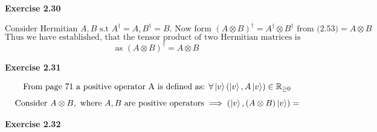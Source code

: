 \documentclass{article}
\begin{document}
\bigskip

\begin{framed}
    \noindent \textbf{Exercise 2.30}
    
    \medskip
    $$
    \text{Consider Hermitian }A, B \text{ s.t } A^{\dagger}=A, B^{\dagger} = B. \text{ Now form } (A \otimes B)^{\dagger} = A^{\dagger} \otimes B^{\dagger} \text{ from (2.53)} = A \otimes B
    $$
    $$
    \text{Thus we have established, that the tensor product of two Hermitian matrices is Hermitian,}
    $$
    $$
    \text{as } (A \otimes B)^{\dagger} = A \otimes B
    $$
    
\end{framed}

\bigskip

\begin{framed}
    \noindent \textbf{Exercise 2.31}
    
    \medskip
    
    $$
    \text{From page 71 a positive operator A is defined as: } \forall \ket{v} (\ket{v}, A\ket{v}) \in \mathbb{R}_{\geq 0}
    $$  
    $$
    \text{Consider } A \otimes B, \text{ where } A,B \text{ are positive operators} \implies 
    (\ket{v}, (A \otimes B)\ket{v}) = 
    $$
\end{framed}

\bigskip

\begin{framed}
    \noindent \textbf{Exercise 2.32}
    
    \medskip
    
    
\end{framed}

\bigskip
\end{document}
